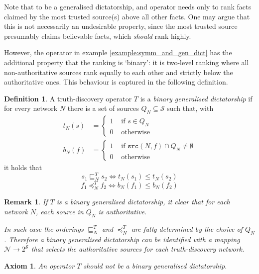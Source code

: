 \documentclass{article}
\theoremstyle{definition} \newtheorem{definition}{Definition}
\theoremstyle{definition} \newtheorem{example}{Example}
\theoremstyle{plain} \newtheorem{axiom}{Axiom}
\theoremstyle{plain} \newtheorem*{remark}{Remark}
\theoremstyle{remark} \newtheorem*{notation}{Notation}
\theoremstyle{plain} \newtheorem{lemma}{Lemma}
\theoremstyle{plain} \newtheorem{theorem}{Theorem}
\theoremstyle{plain} \newtheorem{proposition}{Proposition}
\renewcommand{\S}{\mathcal{S}}  %
\newcommand{\N}{\mathcal{N}}
\newcommand{\sle}{\sqsubseteq}
\newcommand{\fle}{\preceq}
\newcommand{\src}{\texttt{src}}
\begin{document}
Note that to be a generalised dictatorship, and operator needs only to rank
facts claimed by the most trusted source(s) above all other facts. One may
argue that this is not necessarily an undesirable property, since the most
trusted source presumably claims believable facts, which \emph{should} rank
highly.

However, the operator in example \ref{example:symm_and_gen_dict} has the
additional property that the ranking is `binary': it is two-level ranking where
all non-authoritative sources rank equally to each other and
strictly below the authoritative ones. This behaviour is captured in the
following definition.

\begin{definition}
A truth-discovery operator $T$ is a \emph{binary generalised dictatorship} if
for every network $N$ there is a set of sources $Q_N \subseteq \S$ such that,
with
\begin{align*}
    t_N(s) & = \begin{cases}
        1 & \text{ if } s \in Q_N \\
        0 & \text{ otherwise}
    \end{cases} \\
    b_N(f) & = \begin{cases}
        1 & \text{ if } \src(N, f) \cap Q_N \ne \emptyset \\
        0 & \text{ otherwise}
    \end{cases}
\end{align*}
it holds that
\[ s_1 \sle_N^T s_2 \iff t_N(s_1) \le t_N(s_2) \]
\[ f_1 \fle_N^T f_2 \iff b_N(f_1) \le b_N(f_2) \]

\end{definition}

\begin{remark}
If $T$ is a binary generalised dictatorship, it clear that for each network
$N$, each source in $Q_N$ is authoritative.

In such case the orderings $\sle_N^T$ and $\fle_N^T$ are fully determined by
the choice of $Q_N$. Therefore a binary generalised dictatorship can be
identified with a mapping $\N \rightarrow 2^\S$ that selects the authoritative
sources for each truth-discovery network.
\end{remark}

\begin{axiom}
\label{axiom:non_bin_gen_dict}
An operator $T$ should not be a binary generalised dictatorship.
\end{axiom}
\end{document}
